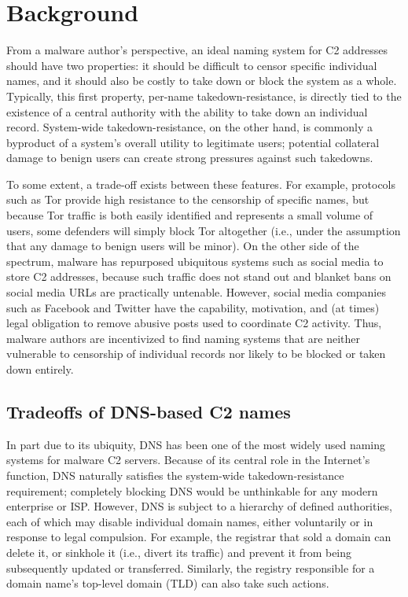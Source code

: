 \section{Background}
\label{sec:background}

From a malware author's perspective, an ideal naming system for C2
addresses should have two properties: it should be difficult to censor
specific individual names, and it should also be costly to take down
or block the system as a whole.  Typically, this first property,
per-name takedown-resistance, is directly tied to the existence of a
central authority with the ability to take down an individual record.
System-wide takedown-resistance, on the other hand, is commonly a
byproduct of a system's overall utility to legitimate users; 
potential
collateral damage to benign users can create strong pressures against
such takedowns.

To some extent, a trade-off exists between these features. For
example, protocols such as Tor provide high resistance to the
censorship of specific names, but because Tor traffic is both easily
identified and represents a small volume of users, some defenders will
simply block Tor altogether (i.e., under the assumption that any
damage to benign users will be minor).  On the other side of 
the
spectrum, malware has repurposed ubiquitous systems such as social
media to store C2 addresses, because such traffic does not stand out
and blanket bans on social media URLs are practically untenable.
However, social media companies such as Facebook and Twitter have the
capability, motivation, and (at times) legal obligation to remove
abusive posts used to coordinate C2 activity.  Thus, malware authors
are incentivized to find naming systems that are neither vulnerable to
censorship of individual records nor likely to be blocked or taken
down entirely.

\subsection{Tradeoffs of DNS-based C2 names}

In part due to its ubiquity, DNS has been one of the most widely used
naming systems for malware C2 servers.  Because of its central role in
the Internet's function, DNS naturally satisfies the system-wide
takedown-resistance requirement; completely blocking DNS would be
unthinkable for any modern enterprise or ISP.  However, DNS is subject
to a hierarchy of defined authorities, each of which may disable
individual domain names, either voluntarily or in response to legal
compulsion.  For example, the registrar that sold a domain can delete
it, or sinkhole it (i.e., divert its traffic) and prevent it from
being subsequently updated or transferred.  Similarly, the registry
responsible for a domain name's top-level domain (TLD) can also take
such actions.

